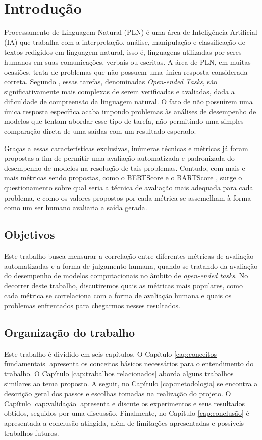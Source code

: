 \documentclass[cic,tc]{iiufrgs}
\begin{document}
\tableofcontents


\chapter{Introdução}
Processamento de Linguagem Natural (PLN) é uma área de Inteligência Artificial (IA) que trabalha com a interpretação, análise, manipulação e classificação de textos redigidos em linguagem natural, isso é, linguagens utilizadas por seres humanos em suas comunicações, verbais ou escritas. A área de PLN, em muitas ocasiões, trata de problemas que não possuem uma única resposta considerada correta. Segundo \citet{burrows2015eras}, essas tarefas, denominadas \textit{Open-ended Tasks}, são significativamente mais complexas de serem verificadas e avaliadas, dada a dificuldade de compreensão da linguagem natural. O fato de não possuírem uma única resposta específica acaba impondo problemas às análises de desempenho de modelos que tentam abordar esse tipo de tarefa, não permitindo uma simples comparação direta de uma saídas com um resultado esperado.

Graças a essas características exclusivas, inúmeras técnicas e métricas já foram propostas a fim de permitir uma avaliação automatizada e padronizada do desempenho de modelos na resolução de tais problemas. Contudo, com mais e mais métricas sendo propostas, como o BERTScore \cite{bert-score} e o BARTScore \cite{yuan2021bartscore}, surge o questionamento sobre qual seria a técnica de avaliação mais adequada para cada problema, e como os valores propostos por cada métrica se assemelham à forma como um ser humano avaliaria a saída gerada.

\section{Objetivos}
Este trabalho busca mensurar a correlação entre diferentes métricas de avaliação automatizadas e a forma de julgamento humana, quando se tratando da avaliação do desempenho de modelos computacionais no âmbito de \textit{open-ended tasks}. No decorrer deste trabalho, discutiremos quais as métricas mais populares, como cada métrica se correlaciona com a forma de avaliação humana e quais os problemas enfrentados para chegarmos nesses resultados. 

\section{Organização do trabalho}
Este trabalho é dividido em seis capítulos. O Capítulo \ref{cap:conceitos fundamentais} apresenta os conceitos básicos necessários para o entendimento do trabalho. O Capítulo \ref{cap:trabalhos relacionados} aborda alguns trabalhos similares ao tema proposto. A seguir, no Capítulo \ref{cap:metodologia} se encontra a descrição geral dos passos e escolhas tomadas na realização do projeto. O Capítulo \ref{cap:validação} apresenta e discute os experimentos e seus resultados obtidos, seguidos por uma discussão. Finalmente, no Capítulo \ref{cap:conclusão} é apresentada a conclusão atingida, além de limitações apresentadas e possíveis trabalhos futuros.
\end{document}
